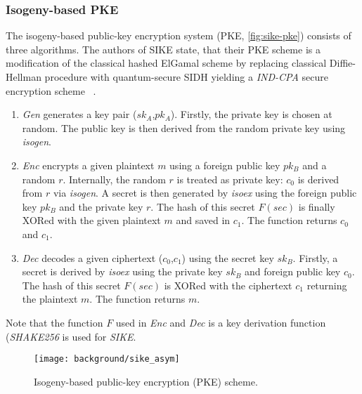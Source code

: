 \subsubsection{Isogeny-based \gls{PKE}}
The isogeny-based public-key encryption system (\gls{PKE}, \autoref{fig:sike-pke}) consists of three algorithms. The authors of \gls{SIKE} state, that their \gls{PKE} scheme is a modification of the classical hashed ElGamal scheme by replacing classical Diffie-Hellman procedure with quantum-secure \gls{SIDH} yielding a \textit{IND-CPA} secure encryption scheme~\parencite{sike2020spec} .
\begin{enumerate}
\item \textit{Gen} generates a key pair ($sk_A$,$pk_A$). Firstly, the private key is chosen at random. The public key is then derived from the random private key using \textit{isogen}.
\item \textit{\gls{Enc}} encrypts a given plaintext $m$ using a foreign public key $pk_B$ and a random $r$. Internally, the random $r$ is treated as private key: $c_0$ is derived from $r$ via \textit{isogen}. A secret is then generated by \textit{isoex} using the foreign public key $pk_B$ and the private key $r$. The hash of this secret $F(sec)$ is finally XORed with the given plaintext $m$ and saved in $c_1$. The function returns $c_0$ and $c_1$.
\item \textit{\gls{Dec}} decodes a given ciphertext ($c_0$,$c_1$) using the secret key $sk_B$. Firstly, a secret is derived by \textit{isoex} using the private key $sk_B$ and foreign public key $c_0$. The hash of this secret $F(sec)$ is XORed with the ciphertext $c_1$ returning the plaintext $m$. The function returns $m$.
\end{enumerate}
Note that the function $F$ used in \textit{\gls{Enc}} and \textit{\gls{Dec}} is a key derivation function (\textit{SHAKE256} is used for \textit{\gls{SIKE}}.

\begin{figure}[H]
  \centering
  \texttt{[image: background/sike\_asym]}
  \caption[Isogeny-based \gls{PKE}]
  {Isogeny-based public-key encryption (\gls{PKE}) scheme.} \label{fig:sike-pke}
\end{figure}

